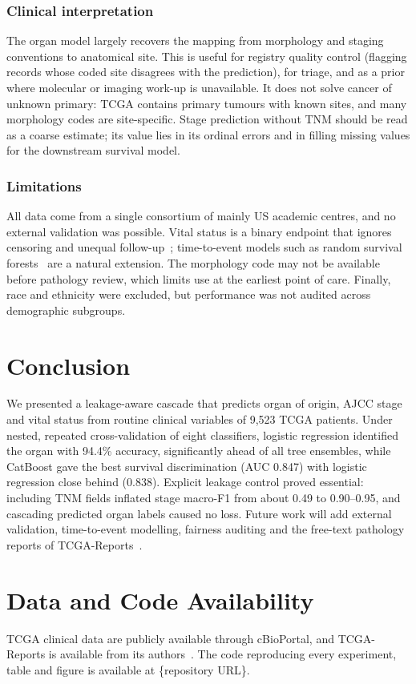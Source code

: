 \documentclass[conference]{IEEEtran}
\begin{document}
\subsubsection*{Clinical interpretation}
The organ model largely recovers the mapping from morphology and staging conventions to anatomical site. This is useful for registry quality control (flagging records whose coded site disagrees with the prediction), for triage, and as a prior where molecular or imaging work-up is unavailable. It does not solve cancer of unknown primary: TCGA contains primary tumours with known sites, and many morphology codes are site-specific. Stage prediction without TNM should be read as a coarse estimate; its value lies in its ordinal errors and in filling missing values for the downstream survival model.

\subsubsection*{Limitations}
All data come from a single consortium of mainly US academic centres, and no external validation was possible. Vital status is a binary endpoint that ignores censoring and unequal follow-up~\cite{liu2018}; time-to-event models such as random survival forests~\cite{ishwaran2008} are a natural extension. The morphology code may not be available before pathology review, which limits use at the earliest point of care. Finally, race and ethnicity were excluded, but performance was not audited across demographic subgroups.

\section{Conclusion}
We presented a leakage-aware cascade that predicts organ of origin, AJCC stage and vital status from routine clinical variables of 9,523 TCGA patients. Under nested, repeated cross-validation of eight classifiers, logistic regression identified the organ with 94.4\% accuracy, significantly ahead of all tree ensembles, while CatBoost gave the best survival discrimination (AUC 0.847) with logistic regression close behind (0.838). Explicit leakage control proved essential: including TNM fields inflated stage macro-F1 from about 0.49 to 0.90--0.95, and cascading predicted organ labels caused no loss. Future work will add external validation, time-to-event modelling, fairness auditing and the free-text pathology reports of TCGA-Reports~\cite{kefeli2024}.

\section*{Data and Code Availability}
TCGA clinical data are publicly available through cBioPortal, and TCGA-Reports is available from its authors~\cite{kefeli2024}. The code reproducing every experiment, table and figure is available at \{repository URL\}.


\end{document}
